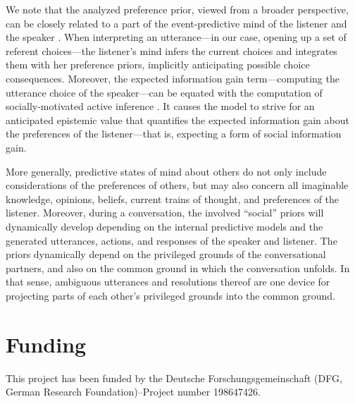 \documentclass[11pt,a4paper]{article}
\begin{document}
We note that the analyzed preference prior, viewed from a broader perspective, can be closely related to a part of the event-predictive mind of the listener and the speaker \cite{Butz:2016,Butz:2017}. 
When interpreting an utterance---in our case, opening up a set of referent choices---the listener's mind infers the current choices and integrates them with her preference priors, implicitly anticipating possible choice consequences.
Moreover, the expected information gain term---computing the utterance choice of the speaker---can be equated with the computation of socially-motivated active inference \cite{Butz:2017a,Friston:2015}.
It causes the model to strive for an anticipated epistemic value that quantifies the expected information gain about the preferences of the listener---that is, expecting a form of social information gain. 


More generally, predictive states of mind about others do not only include considerations of the preferences of others, but may also concern all imaginable knowledge, opinions, beliefs, current trains of thought, and preferences of the listener.
Moreover, during a conversation, the involved ``social'' priors will dynamically develop depending on the internal predictive models and the generated utterances, actions, and responses of the speaker and listener. 
The priors dynamically depend on the privileged grounds of the conversational partners, and also on the common ground in which the conversation unfolds.
In that sense, ambiguous utterances and resolutions thereof are one device for projecting parts of each other's privileged grounds into the common ground. 







\section*{Funding}

This project has been funded by the Deutsche Forschungsgemeinschaft (DFG, German Research Foundation)--Project number 198647426. 
\end{document}

